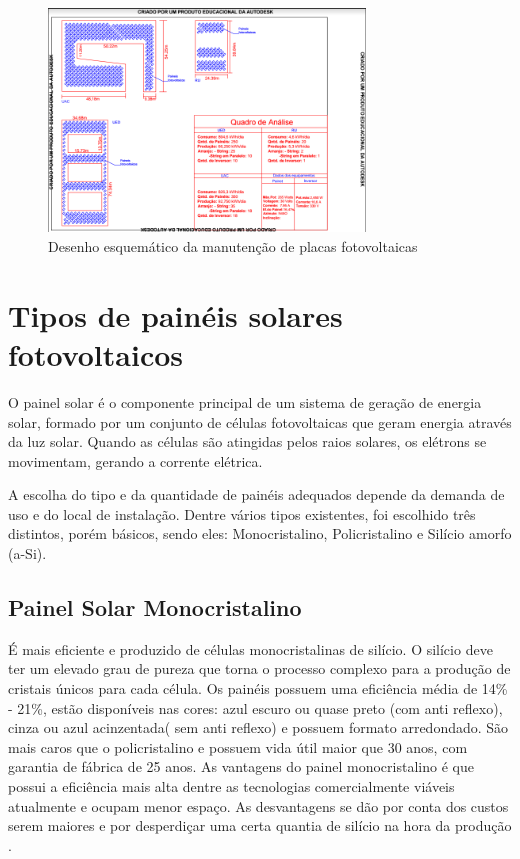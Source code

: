 \begin{figure}[!h]
\centering
\includegraphics[width=0.75\textwidth]{figuras/fotovoltaica.png}
\caption{Desenho esquemático da manutenção de placas fotovoltaicas}
\label{fig:fotovoltaica}
\end{figure}

\section{Tipos de painéis solares fotovoltaicos}

O painel solar é o componente principal de um sistema de geração de energia solar, formado por um conjunto de células fotovoltaicas que geram energia através da luz solar. Quando  as células são atingidas pelos raios solares, os elétrons se movimentam, gerando a corrente elétrica.

A escolha do tipo e da quantidade de painéis adequados depende da demanda de uso e do local de instalação. Dentre vários tipos existentes, foi escolhido três distintos, porém básicos, sendo eles: Monocristalino, Policristalino e Silício amorfo (a-Si).

\subsection{Painel Solar Monocristalino}

É mais eficiente e produzido de células monocristalinas de silício. O silício deve ter um elevado grau de pureza que torna o processo complexo para a produção de cristais únicos para cada célula. Os painéis possuem uma eficiência média de 14\% - 21\%, estão disponíveis nas cores: azul escuro ou quase preto (com anti reflexo), cinza ou azul acinzentada( sem anti reflexo) e possuem formato arredondado. São mais caros que o policristalino e possuem vida útil maior que 30 anos, com garantia de fábrica de 25 anos. As vantagens do painel monocristalino é  que possui a eficiência mais alta dentre as tecnologias comercialmente viáveis atualmente e ocupam menor espaço. As desvantagens se dão por conta dos custos serem maiores e por desperdiçar uma certa quantia de silício na hora da produção \cite{neosolar}.

